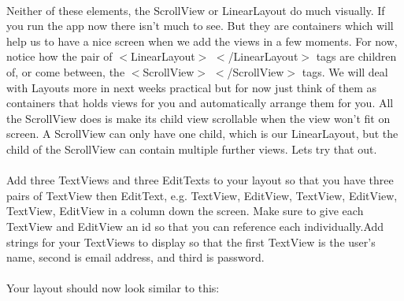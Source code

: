 \documentclass[12pt, a4paper, twoside]{book}
\begin{document}
\paragraph{} Neither of these elements, the ScrollView or LinearLayout do much visually. If you run the app now there isn't much to see. But they are containers which will help us to have a nice screen when we add the views in a few moments. For now, notice how the pair of $<$LinearLayout$>$ $<$/LinearLayout$>$ tags are children of, or come between, the $<$ScrollView$>$ $<$/ScrollView$>$ tags. We will deal with Layouts more in next weeks practical but for now just think of them as containers that holds views for you and automatically arrange them for you. All the ScrollView does is make its child view scrollable when the view won't fit on screen. A ScrollView can only have one child, which is our LinearLayout, but the child of the ScrollView can contain multiple further views. Lets try that out.

\paragraph{} Add three TextViews and three EditTexts to your layout so that you have three pairs of TextView then EditText, e.g. TextView, EditView, TextView, EditView, TextView, EditView in a column down the screen. Make sure to give each TextView and EditView an id so that you can reference each individually.Add strings for your TextViews to display so that the first TextView is the user's name, second is email address, and third is password.

\paragraph{} Your layout should now look similar to this:
\end{document}
